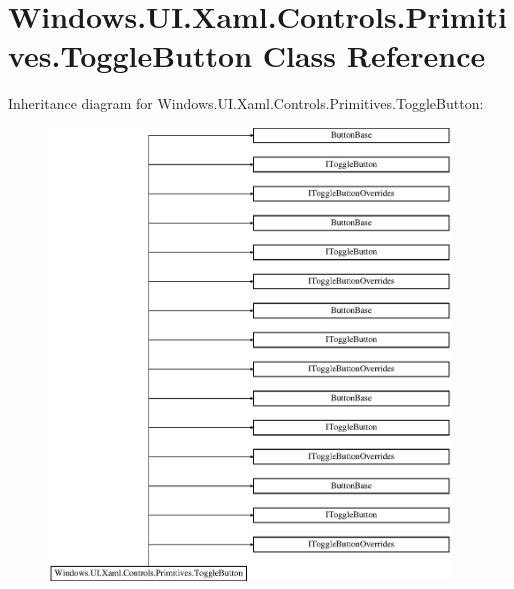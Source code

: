 \hypertarget{class_windows_1_1_u_i_1_1_xaml_1_1_controls_1_1_primitives_1_1_toggle_button}{}\section{Windows.\+U\+I.\+Xaml.\+Controls.\+Primitives.\+Toggle\+Button Class Reference}
\label{class_windows_1_1_u_i_1_1_xaml_1_1_controls_1_1_primitives_1_1_toggle_button}
Inheritance diagram for Windows.\+U\+I.\+Xaml.\+Controls.\+Primitives.\+Toggle\+Button\+:\begin{figure}[H]
\begin{center}
\leavevmode
\includegraphics[height=12.000000cm]{class_windows_1_1_u_i_1_1_xaml_1_1_controls_1_1_primitives_1_1_toggle_button}
\end{center}
\end{figure}
